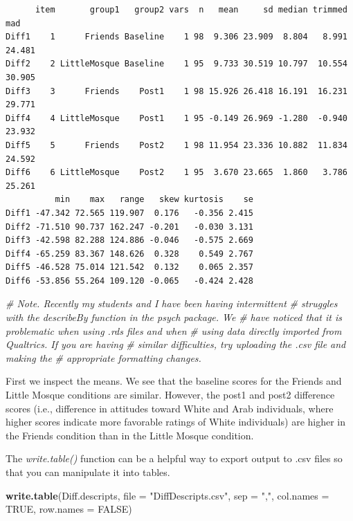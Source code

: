\documentclass[
  11pt,
]{book}
\newenvironment{Shaded}{\begin{snugshade}}{\end{snugshade}}
\newcommand{\AttributeTok}[1]{\textcolor[rgb]{0.27,0.27,0.27}{#1}}
\newcommand{\CommentTok}[1]{\textcolor[rgb]{0.37,0.37,0.37}{\textit{#1}}}
\newcommand{\ConstantTok}[1]{\textcolor[rgb]{0.37,0.37,0.37}{#1}}
\newcommand{\FunctionTok}[1]{\textcolor[rgb]{0.27,0.27,0.27}{\textbf{#1}}}
\newcommand{\NormalTok}[1]{#1}
\newcommand{\StringTok}[1]{\textcolor[rgb]{0.5,0.5,0.5}{#1}}
\begin{document}
\begin{verbatim}
      item       group1   group2 vars  n   mean     sd median trimmed    mad
Diff1    1      Friends Baseline    1 98  9.306 23.909  8.804   8.991 24.481
Diff2    2 LittleMosque Baseline    1 95  9.733 30.519 10.797  10.554 30.905
Diff3    3      Friends    Post1    1 98 15.926 26.418 16.191  16.231 29.771
Diff4    4 LittleMosque    Post1    1 95 -0.149 26.969 -1.280  -0.940 23.932
Diff5    5      Friends    Post2    1 98 11.954 23.336 10.882  11.834 24.592
Diff6    6 LittleMosque    Post2    1 95  3.670 23.665  1.860   3.786 25.261
          min    max   range   skew kurtosis    se
Diff1 -47.342 72.565 119.907  0.176   -0.356 2.415
Diff2 -71.510 90.737 162.247 -0.201   -0.030 3.131
Diff3 -42.598 82.288 124.886 -0.046   -0.575 2.669
Diff4 -65.259 83.367 148.626  0.328    0.549 2.767
Diff5 -46.528 75.014 121.542  0.132    0.065 2.357
Diff6 -53.856 55.264 109.120 -0.065   -0.424 2.428
\end{verbatim}

\begin{Shaded}
\begin{Highlighting}[]
\CommentTok{\# Note. Recently my students and I have been having intermittent}
\CommentTok{\# struggles with the describeBy function in the psych package. We}
\CommentTok{\# have noticed that it is problematic when using .rds files and when}
\CommentTok{\# using data directly imported from Qualtrics. If you are having}
\CommentTok{\# similar difficulties, try uploading the .csv file and making the}
\CommentTok{\# appropriate formatting changes.}
\end{Highlighting}
\end{Shaded}

First we inspect the means. We see that the baseline scores for the Friends and Little Mosque conditions are similar. However, the post1 and post2 difference scores (i.e., difference in attitudes toward White and Arab individuals, where higher scores indicate more favorable ratings of White individuals) are higher in the Friends condition than in the Little Mosque condition.

The \emph{write.table()} function can be a helpful way to export output to .csv files so that you can manipulate it into tables.

\begin{Shaded}
\begin{Highlighting}[]
\FunctionTok{write.table}\NormalTok{(Diff.descripts, }\AttributeTok{file =} \StringTok{"DiffDescripts.csv"}\NormalTok{, }\AttributeTok{sep =} \StringTok{","}\NormalTok{, }\AttributeTok{col.names =} \ConstantTok{TRUE}\NormalTok{,}
    \AttributeTok{row.names =} \ConstantTok{FALSE}\NormalTok{)}
\end{Highlighting}
\end{Shaded}
\end{document}
